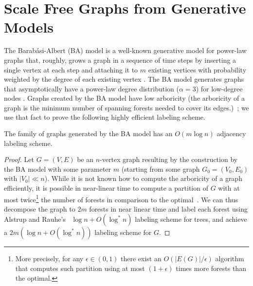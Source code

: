 \section{Scale Free  Graphs from Generative Models}\label{Sec:ScaleFree}
The Barab{\'a}si-Albert (BA) model is a well-known generative model for power-law graphs that, roughly, grows a graph in a sequence of time steps by
inserting a single vertex at each step and attaching it to $m$ existing vertices with probability weighted by the degree of each existing vertex \cite{barabasi1999emergence}. The BA model
generates graphs that asymptotically have a power-law degree distribution ($\alpha = 3$) for low-degree nodes \cite{DBLP:journals/rsa/BollobasRST01}.
Graphs created by the BA model have low arboricity (the arboricity of a graph is the minimum number of spanning forests needed to cover its edges.)~\cite{goel2006bounded}; we use
that fact to prove the following highly efficient labeling scheme. 



\begin{proposition}\label{Th:baLabeling}
The family of graphs generated by the BA model has an $O(m \log n)$ adjacency labeling scheme.
\end{proposition}

\begin{proof}
Let  $G=(V,E)$  be an $n$-vertex graph resulting by the construction  by the BA model with some parameter $m$ (starting from some graph $G_0 = (V_0,E_0)$ with $\vert V_0 \vert \ll n$).
While it is not known how to compute the   arboricity of a graph efficiently, it is possible in near-linear time to compute a partition of $G$ with  at most twice\footnote{More precisely, for any $\epsilon \in (0,1)$  there exist an $O(|E(G)| / \epsilon)$ algorithm~\cite{kowalik2006approximation} that computes such partition using at most $(1+ \epsilon)$ times more forests than the optimal.} the number of forests in comparison to the optimal~\cite{arikati1997efficient}.
We can thus decompose the graph to $2m$ forests in near linear time and label each forest using Alstrup and Rauhe's~\cite{Alstrup02} $\log n + O(\log^* n)$ labeling scheme for trees,  and achieve a $2m (\log n + O(\log^* n))$ labeling scheme for $G$.
\end{proof}

